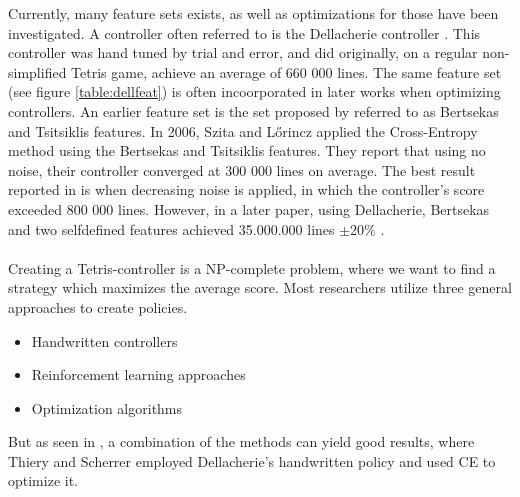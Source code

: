 Currently, many feature sets exists, as well as optimizations for those have been
investigated. A controller often referred to is the Dellacherie controller 
\citep{fahey}. This controller was hand tuned by trial and error,
and did originally, on a regular non-simplified Tetris game, achieve an average of
660 000 lines. The same feature set (see figure \ref{table:dellfeat}) is 
often incoorporated in later works when optimizing controllers. An earlier
feature set is the set proposed by \citep{Bertsekas} referred to as Bertsekas and
Tsitsiklis features. In 2006, Szita and L\H{o}rincz \citep{szita:06} applied the Cross-Entropy
method using the Bertsekas and Tsitsiklis features. They report that using no noise,
their controller converged at 300 000 lines on average. 
The best result reported in \citep{szita:06}
is when decreasing noise is applied, 
in which the controller's score exceeded 800 000 lines. 
However, in a later paper, using Dellacherie, 
Bertsekas and two selfdefined features achieved 
35.000.000 lines $\pm 20\%$  \citep{scherrer2009}.\\
\\
Creating a Tetris-controller is a NP-complete problem, 
where we want to find a strategy which maximizes 
the average score. Most researchers utilize three 
general approaches to create policies.

\begin{itemize}
\item Handwritten controllers
\item Reinforcement learning approaches
\item Optimization algorithms
\end{itemize}

But as seen in \citep{scherrer2009}, 
a combination of the methods can yield good results, 
where Thiery and Scherrer employed Dellacherie's 
handwritten policy and used CE to optimize it.
